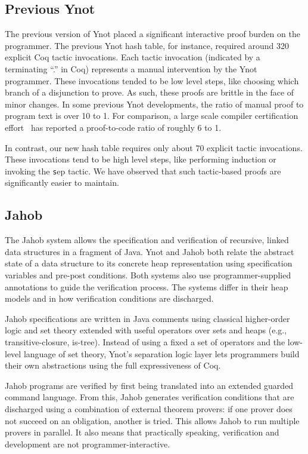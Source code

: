 \documentclass[preprint,nocopyrightspace]{sigplanconf}
\begin{document}
{\subsection{Previous Ynot}

The previous version of Ynot placed a significant interactive proof
burden on the programmer.  The previous Ynot hash table, for instance,
required around 320 explicit Coq tactic invocations.  Each tactic
invocation (indicated by a terminating ``.'' in Coq) represents a manual intervention by the
Ynot programmer.  These invocations tended to be low level steps, like
choosing which branch of a disjunction to prove.  As such, these
proofs are brittle in the face of minor changes.  In some previous
Ynot developments, the ratio of manual proof to program text is over
10 to 1. For comparison, a large scale compiler certification
effort~\cite{leroy} has reported a proof-to-code ratio of roughly 6 to
1.

In contrast, our new hash table requires only about 70 explicit tactic
invocations.  These invocations tend to be high level steps, like
performing induction or invoking the {\texttt sep} tactic.  We have
observed that such tactic-based proofs are significantly easier to
maintain.

\subsection{Jahob}

The Jahob system allows the specification and verification 
of recursive, linked data structures in a fragment of Java.  Ynot and Jahob 
both relate the abstract state of a data structure to its concrete heap representation
using specification variables and pre-post conditions. Both systems also use
programmer-supplied annotations to guide the verification process.  The systems 
differ in their heap models and in how verification conditions are discharged.

Jahob specifications are written in Java comments using classical higher-order
logic and set theory extended with useful operators over sets and heaps (e.g., 
transitive-closure, is-tree).  Instead of using a fixed a set of operators and
the low-level language of set theory, Ynot's separation logic layer lets 
programmers build their own abstractions using the full expressiveness of Coq.  
 
Jahob programs are verified by first being translated into an extended guarded command language.
From this, Jahob generates verification conditions 
 that are discharged using a combination of external theorem provers: if one prover does not succeed 
on an obligation, another is tried.  This allows Jahob to run multiple
provers in parallel.  It also means that practically speaking, verification 
and development are not programmer-interactive.

}
\end{document}
